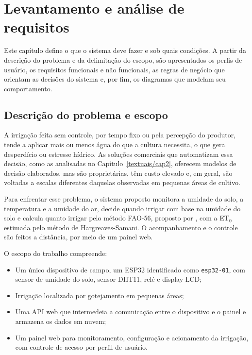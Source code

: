 \chapter{Levantamento e análise de requisitos}
\label{textuais/cap4}

Este capítulo define o que o sistema deve fazer e sob quais condições. A partir da descrição do problema e da delimitação do escopo, são apresentados os perfis de usuário, os requisitos funcionais e não funcionais, as regras de negócio que orientam as decisões do sistema e, por fim, os diagramas que modelam seu comportamento.

\section{Descrição do problema e escopo}
\label{sec:problema-escopo}

A irrigação feita sem controle, por tempo fixo ou pela percepção do produtor, tende a aplicar mais ou menos água do que a cultura necessita, o que gera desperdício ou estresse hídrico. As soluções comerciais que automatizam essa decisão, como as analisadas no Capítulo~\ref{textuais/cap2}, oferecem modelos de decisão elaborados, mas são proprietárias, têm custo elevado e, em geral, são voltadas a escalas diferentes daquelas observadas em pequenas áreas de cultivo.

Para enfrentar esse problema, o sistema proposto monitora a umidade do solo, a temperatura e a umidade do ar, decide quando irrigar com base na umidade do solo e calcula quanto irrigar pelo método FAO-56, proposto por , com a ET$_0$ estimada pelo método de Hargreaves-Samani. O acompanhamento e o controle são feitos a distância, por meio de um painel web.

O escopo do trabalho compreende:
\begin{itemize}
  \item Um único dispositivo de campo, um ESP32 identificado como \texttt{esp32-01}, com sensor de umidade do solo, sensor DHT11, relé e display LCD;
  \item Irrigação localizada por gotejamento em pequenas áreas;
  \item Uma API web que intermedeia a comunicação entre o dispositivo e o painel e armazena os dados em nuvem;
  \item Um painel web para monitoramento, configuração e acionamento da irrigação, com controle de acesso por perfil de usuário.
\end{itemize}


